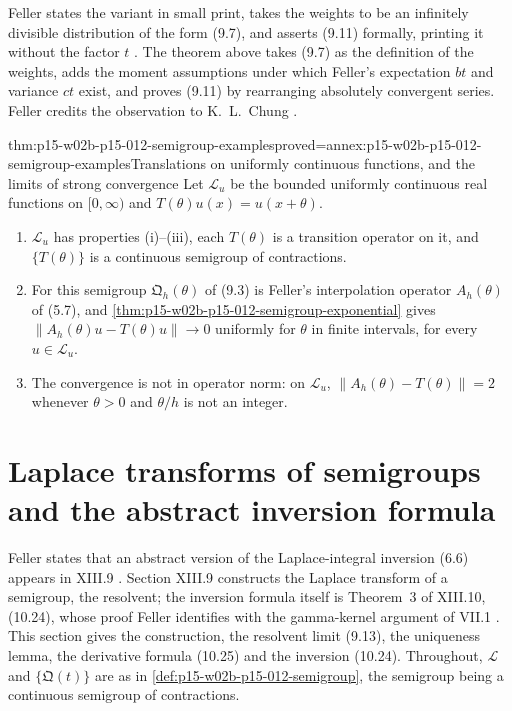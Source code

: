 Feller states the variant in small print, takes the weights to be an
infinitely divisible distribution of the form (9.7), and asserts (9.11)
formally, printing it without the factor \(t\)
\cite[vol.~II, X.9, p.~355]{Feller1971ProbabilityII}. The theorem above takes
(9.7) as the definition of the weights, adds the moment assumptions under
which Feller's expectation \(bt\) and variance \(ct\) exist, and proves (9.11)
by rearranging absolutely convergent series. Feller credits the observation to
K.~L.~Chung \cite[vol.~II, X.9, p.~355, n.~32]{Feller1971ProbabilityII}.

\begin{hbtheorem}{thm:p15-w02b-p15-012-semigroup-examples}{proved=annex:p15-w02b-p15-012-semigroup-examples}{Translations on uniformly continuous functions, and the limits of strong convergence}
Let \(\mathscr L_u\) be the bounded uniformly continuous real functions on
\([0,\infty)\) and \(T(\theta)u(x)=u(x+\theta)\).
\begin{enumerate}
\item \(\mathscr L_u\) has properties (i)--(iii), each \(T(\theta)\) is a
      transition operator on it, and \(\{T(\theta)\}\) is a continuous
      semigroup of contractions.
\item For this semigroup \(\mathfrak Q_h(\theta)\) of (9.3) is Feller's
      interpolation operator \(A_h(\theta)\) of (5.7), and
      \cref{thm:p15-w02b-p15-012-semigroup-exponential} gives
      \(\|A_h(\theta)u-T(\theta)u\|\to0\) uniformly for \(\theta\) in finite
      intervals, for every \(u\in\mathscr L_u\).
\item The convergence is not in operator norm: on \(\mathscr L_u\),
      \(\|A_h(\theta)-T(\theta)\|=2\) whenever \(\theta>0\) and \(\theta/h\)
      is not an integer.
\end{enumerate}
\end{hbtheorem}

\section{Laplace transforms of semigroups and the abstract inversion formula}
\label{sec:p15-w02b-p15-012-resolvents}

Feller states that an abstract version of the Laplace-integral inversion (6.6)
appears in XIII.9 \cite[vol.~II, VII.6, p.~233]{Feller1971ProbabilityII}.
Section XIII.9 constructs the Laplace transform of a semigroup, the resolvent;
the inversion formula itself is Theorem~3 of XIII.10, (10.24), whose proof
Feller identifies with the gamma-kernel argument of VII.1
\cite[vol.~II, XIII.9, pp.~454--457; XIII.10, pp.~462--463]{Feller1971ProbabilityII}.
This section gives the construction, the resolvent limit (9.13), the
uniqueness lemma, the derivative formula (10.25) and the inversion (10.24).
Throughout, \(\mathscr L\) and \(\{\mathfrak Q(t)\}\) are as in
\cref{def:p15-w02b-p15-012-semigroup}, the semigroup being a continuous
semigroup of contractions.

